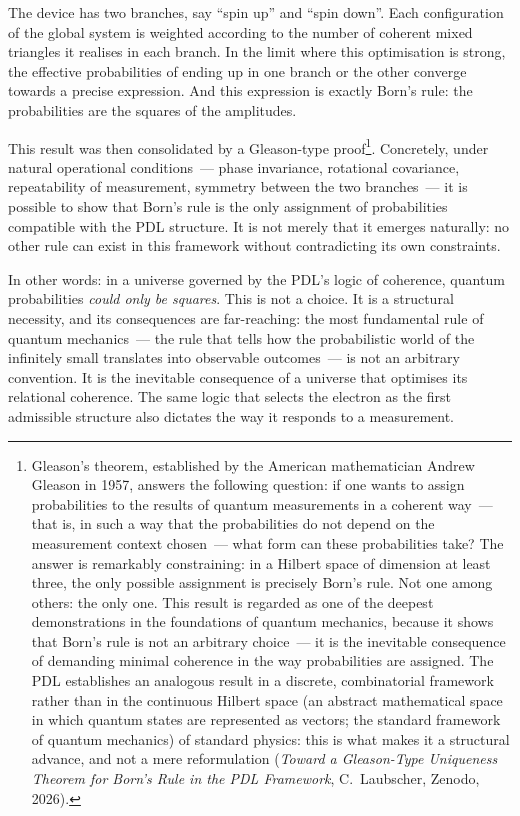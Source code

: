 \documentclass[12pt, a4paper, openright]{book}
\begin{document}
\medskip

The device has two branches, say “spin up” and “spin down”. Each configuration of the global system is weighted according to the number of coherent mixed triangles it realises in each branch. In the limit where this optimisation is strong, the effective probabilities of ending up in one branch or the other converge towards a precise expression. And this expression is exactly Born’s rule: the probabilities are the squares of the amplitudes.

\medskip

This result was then consolidated by a Gleason-type proof\footnote{Gleason's theorem, established by the American mathematician Andrew Gleason in 1957, answers the following question: if one wants to assign probabilities to the results of quantum measurements in a coherent way~--- that is, in such a way that the probabilities do not depend on the measurement context chosen~--- what form can these probabilities take? The answer is remarkably constraining: in a Hilbert space of dimension at least three, the only possible assignment is precisely Born's rule. Not one among others: the only one. This result is regarded as one of the deepest demonstrations in the foundations of quantum mechanics, because it shows that Born's rule is not an arbitrary choice~--- it is the inevitable consequence of demanding minimal coherence in the way probabilities are assigned. The PDL establishes an analogous result in a discrete, combinatorial framework rather than in the continuous Hilbert space (an abstract mathematical space in which quantum states are represented as vectors; the standard framework of quantum mechanics) of standard physics: this is what makes it a structural advance, and not a mere reformulation (\textit{Toward a Gleason-Type Uniqueness Theorem for Born's Rule in the PDL Framework}, C.~Laubscher, Zenodo, 2026).}. Concretely, under natural operational conditions~--- phase invariance, rotational covariance, repeatability of measurement, symmetry between the two branches~--- it is possible to show that Born's rule is the only assignment of probabilities compatible with the PDL structure. It is not merely that it emerges naturally: no other rule can exist in this framework without contradicting its own constraints.

\medskip

In other words: in a universe governed by the PDL's logic of coherence, quantum probabilities \emph{could only be squares}. This is not a choice. It is a structural necessity, and its consequences are far-reaching: the most fundamental rule of quantum mechanics~--- the rule that tells how the probabilistic world of the infinitely small translates into observable outcomes~--- is not an arbitrary convention. It is the inevitable consequence of a universe that optimises its relational coherence. The same logic that selects the electron as the first admissible structure also dictates the way it responds to a measurement.
\end{document}
